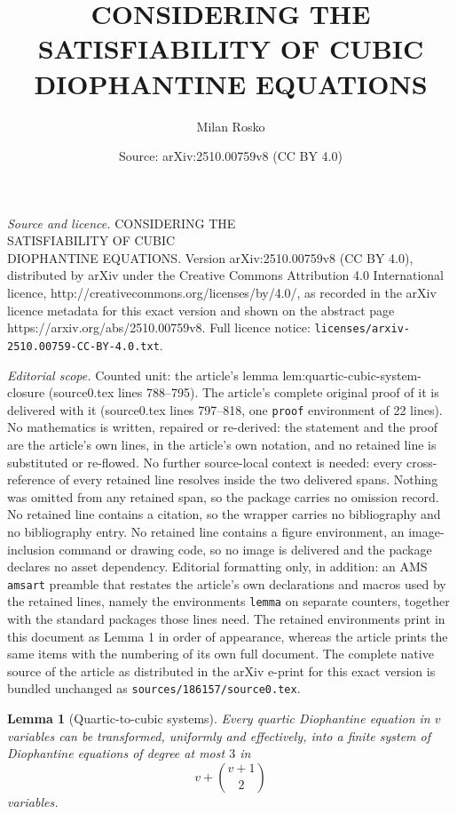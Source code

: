 \documentclass[10pt,a4paper]{amsart}
\title{\uppercase{Considering The\\ Satisfiability of Cubic\\ Diophantine Equations}}
\author{Milan Rosko}
\date{Source: arXiv:2510.00759v8 (CC BY 4.0)}
\newtheorem{lemma}{Lemma}
\begin{document}
\maketitle

\noindent\emph{Source and licence.} \uppercase{Considering The\\ Satisfiability of Cubic\\ Diophantine Equations}. Version arXiv:2510.00759v8 (CC BY 4.0), distributed by arXiv under the Creative Commons Attribution 4.0 International licence, http://creativecommons.org/licenses/by/4.0/, as recorded in the arXiv licence metadata for this exact version and shown on the abstract page https://arxiv.org/abs/2510.00759v8. Full licence notice: \texttt{licenses/arxiv-2510.00759-CC-BY-4.0.txt}.\par\smallskip

\noindent\textit{Editorial scope.} Counted unit: the article's lemma lem:quartic-cubic-system-closure (source0.tex lines 788--795). The article's complete original proof of it is delivered with it (source0.tex lines 797--818, one \texttt{proof} environment of 22 lines). No mathematics is written, repaired or re-derived: the statement and the proof are the article's own lines, in the article's own notation, and no retained line is substituted or re-flowed.  No further source-local context is needed: every cross-reference of every retained line resolves inside the two delivered spans.  Nothing was omitted from any retained span, so the package carries no omission record.  No retained line contains a citation, so the wrapper carries no bibliography and no bibliography entry.  No retained line contains a figure environment, an image-inclusion command or drawing code, so no image is delivered and the package declares no asset dependency.  Editorial formatting only, in addition: an AMS \texttt{amsart} preamble that restates the article's own declarations and macros used by the retained lines, namely the environments \texttt{lemma} on separate counters, together with the standard packages those lines need.  The retained environments print in this document as Lemma 1 in order of appearance, whereas the article prints the same items with the numbering of its own full document.  The complete native source of the article as distributed in the arXiv e-print for this exact version is bundled unchanged as \texttt{sources/186157/source0.tex}.
\begin{lemma}[Quartic-to-cubic systems]
\label{lem:quartic-cubic-system-closure}
	Every quartic Diophantine equation in $v$ variables can be transformed, uniformly and effectively, into a finite system of Diophantine equations of degree at most $3$ in
	\begin{equation}
		v+\binom{v+1}{2}
	\end{equation}
	variables.
\end{lemma}
\end{document}
